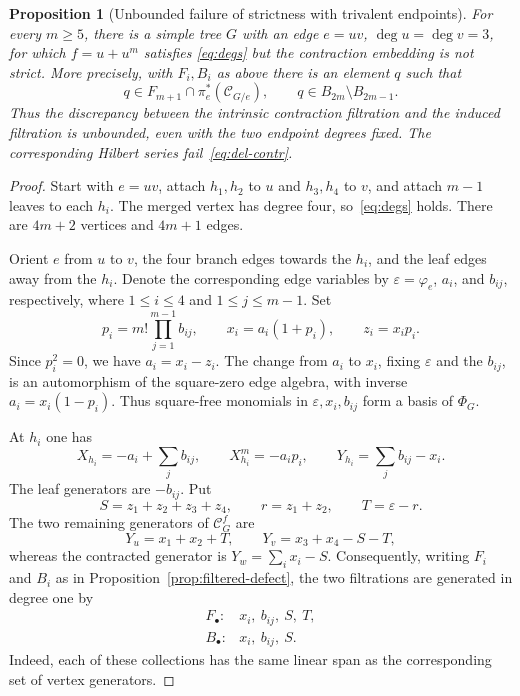 \documentclass[reqno]{article}
\theoremstyle{plain} %
\newtheorem{proposition}[theorem]{Proposition}
\theoremstyle{definition}
\theoremstyle{remark}
\newcommand {\CC}{\mathscr{C}}
\numberwithin{equation}{section}
\begin{document}
\begin{proposition}[Unbounded failure of strictness with trivalent endpoints]
\label{prop:filtered-nonstrict}
For every $m\ge5$, there is a simple tree $G$ with an edge $e=uv$,
$\deg u=\deg v=3$, for which $f=u+u^m$ satisfies
\eqref{eq:degs} but the contraction embedding is not strict.
More precisely, with $F_i,B_i$ as above there is an element $q$ such that
\[
q\in F_{m+1}\cap\pi_e^*(\CC_{G/e}),\qquad
q\in B_{2m}\setminus B_{2m-1}.
\]
Thus the discrepancy between the intrinsic contraction filtration and
the induced filtration is unbounded, even with the two endpoint degrees
fixed. The corresponding Hilbert series fail~\eqref{eq:del-contr}.
\end{proposition}
\begin{proof}
Start with $e=uv$, attach $h_1,h_2$ to $u$ and $h_3,h_4$ to $v$,
and attach $m-1$ leaves to each $h_i$. The merged vertex has degree four,
so~\eqref{eq:degs} holds. There are $4m+2$ vertices and $4m+1$ edges.

Orient $e$ from $u$ to $v$, the four branch edges towards the $h_i$,
and the leaf edges away from the $h_i$.  Denote the corresponding
edge variables by $\varepsilon=\varphi_e$, $a_i$, and $b_{ij}$,
respectively, where $1\le i\le4$ and $1\le j\le m-1$.  Set
\[
p_i=m!\prod_{j=1}^{m-1}b_{ij},\qquad
x_i=a_i(1+p_i),\qquad z_i=x_ip_i.
\]
Since $p_i^2=0$, we have $a_i=x_i-z_i$.  The change from $a_i$ to
$x_i$, fixing $\varepsilon$ and the $b_{ij}$, is an automorphism of the
square-zero edge algebra, with inverse $a_i=x_i(1-p_i)$.
Thus square-free monomials in $\varepsilon,x_i,b_{ij}$ form a basis
of $\Phi_G$.

At $h_i$ one has
\[
X_{h_i}=-a_i+\sum_jb_{ij},\qquad
X_{h_i}^m=-a_ip_i,\qquad
Y_{h_i}=\sum_jb_{ij}-x_i.
\]
The leaf generators are $-b_{ij}$.  Put
\[
S=z_1+z_2+z_3+z_4,\qquad r=z_1+z_2,\qquad T=\varepsilon-r.
\]
The two remaining generators of $\CC_G^f$ are
\[
Y_u=x_1+x_2+T,\qquad Y_v=x_3+x_4-S-T,
\]
whereas the contracted generator is $Y_w=\sum_i x_i-S$.
Consequently, writing $F_i$ and $B_i$ as in
Proposition~\ref{prop:filtered-defect}, the two filtrations are generated
in degree one by
\begin{equation}\label{eq:counterexample-generators}
\begin{array}{ll}
F_\bullet:&x_i,\ b_{ij},\ S,\ T,\\
B_\bullet:&x_i,\ b_{ij},\ S.
\end{array}
\end{equation}
Indeed, each of these collections has the same linear span as the
corresponding set of vertex generators.


\end{proof}
\end{document}
